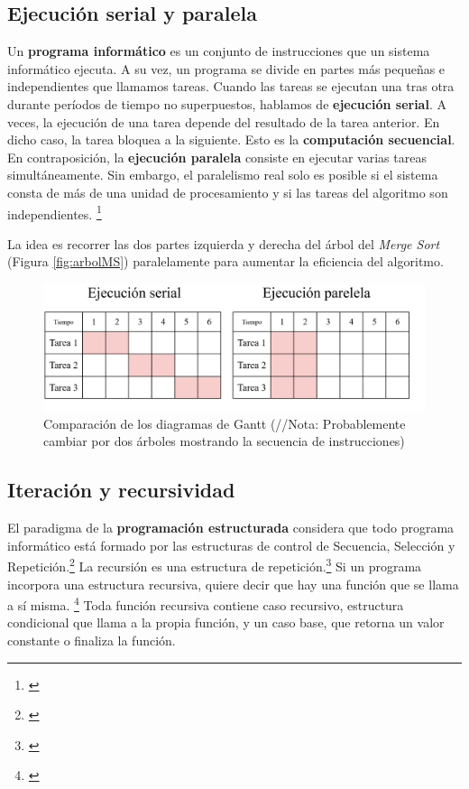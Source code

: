 \documentclass[titlepage]{article}
\begin{document}
\subsection{Ejecución serial y paralela}
Un \textbf{programa informático} es un conjunto de instrucciones que un sistema informático ejecuta. A su vez, un programa se divide en partes más pequeñas e independientes que llamamos tareas. Cuando las tareas se ejecutan una tras otra durante períodos de tiempo no superpuestos, hablamos de \textbf{ejecución serial}. A veces, la ejecución de una tarea depende del resultado de la tarea anterior. En dicho caso, la tarea bloquea a la siguiente. Esto es la \textbf{computación secuencial}. En contraposición, la \textbf{ejecución paralela }consiste en ejecutar varias tareas simultáneamente. Sin embargo, el paralelismo real solo es posible si el sistema consta de más de una unidad de procesamiento y si las tareas del algoritmo son independientes. \footnote{\cite{bobrov-2023}}

La idea es recorrer las dos partes izquierda y derecha del árbol del \textit{Merge Sort} (Figura \ref{fig:arbolMS}) paralelamente para aumentar la eficiencia del algoritmo.

\begin{figure}[htp]
    \centering
    \includegraphics[width=0.75\linewidth]{Diagrames/serialVsParallel.png}
    \caption{Comparación de los diagramas de Gantt (//Nota: Probablemente cambiar por dos árboles mostrando la secuencia de instrucciones)}
    \label{fig:serialVsParallel}
\end{figure}

\subsection{Iteración y recursividad}
El paradigma de la \textbf{programación estructurada} considera que todo programa informático está formado por las estructuras de control de Secuencia, Selección y Repetición.\footnote{\cite{extended-learning-institute-no-date}} La recursión es una estructura de repetición.\footnote{\cite{wellesley-college-2000}} Si un programa incorpora una estructura recursiva, quiere decir que hay una función que se llama a sí misma. \footnote{\cite{bhargava-2016}} Toda función recursiva contiene caso recursivo, estructura condicional que llama a la propia función, y un caso base,  que retorna un valor constante o finaliza la función.
\end{document}
